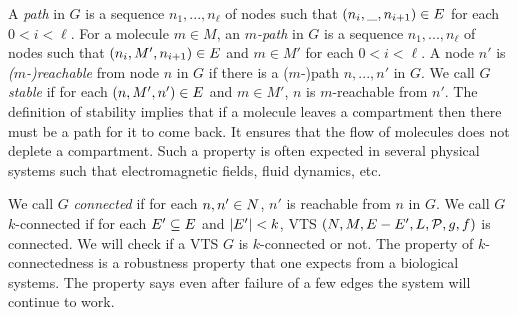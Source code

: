 %

\vspace{0.2cm}
\noindent
A {\em path} in $G$ is a sequence $n_1,...,n_\ell$ of nodes 
such that $(n_i,\_,n_{i+1}) \in E$ for each $ 0 < i < \ell$.
%
For a molecule $m \in M$,
an {\em $m$-path} in $G$ is a sequence $n_1,...,n_\ell$ of nodes 
such that $(n_i,M',n_{i+1}) \in E$ and $m \in M'$ for
each $ 0 < i < \ell$.
%
A node $n'$ is {\em ($m$-)reachable} from node $n$ in $G$ if there is a ($m$-)path
$n,...,n'$ in $G$.
%
%
We call $G$ {\em stable} if for each $(n,M',n') \in E$ and $m \in M'$,
$n$ is $m$-reachable from $n'$.
%
The definition of stability implies that if a molecule leaves a
compartment then there must be a path for it to come back.
%
It ensures that the flow of molecules does not deplete a
compartment.
%
Such a property is often expected in several physical systems
such that electromagnetic fields, fluid dynamics, etc.

%
We call $G$ {\em connected} if for each $n,n' \in N$,
$n'$ is reachable from $n$ in $G$.
%
We call $G$ $k$-connected if for each $E' \subseteq E$ and
$|E'| < k$, VTS
$(N,M,E-E',L,\mathcal{P},g,f)$ is connected.
%
We will check if a VTS $G$ is $k$-connected or not.
%
The property of $k$-connectedness is a robustness property that one
expects from a biological systems.
%
The property says even after failure of a few edges the system will continue to work.


